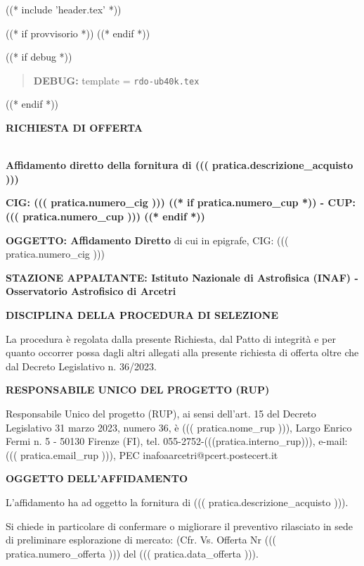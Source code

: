 
((* include 'header.tex' *))

((* if provvisorio *))
((* endif *))



\topaddr

((* if debug *))
\begin{quotation}
	\textbf{DEBUG:} template = \texttt{rdo-ub40k.tex}
\end{quotation}
((* endif *))

\begin{center}
\textbf{RICHIESTA DI OFFERTA}
\end{center}

~\\
\textbf{Affidamento diretto della fornitura di ((( pratica.descrizione_acquisto )))}

\textbf{CIG: ((( pratica.numero_cig )))
((* if pratica.numero_cup *)) - CUP: ((( pratica.numero_cup ))) ((* endif *))}

\textbf{OGGETTO: Affidamento Diretto} di cui in epigrafe, CIG: ((( pratica.numero_cig )))

\textbf{STAZIONE APPALTANTE: Istituto Nazionale di Astrofisica (INAF) - Osservatorio Astrofisico di Arcetri}

\textbf{DISCIPLINA DELLA PROCEDURA DI SELEZIONE}

La procedura è regolata dalla presente Richiesta, dal Patto di integrità
e per quanto occorrer possa dagli altri allegati alla presente richiesta
di offerta oltre che dal Decreto Legislativo n. 36/2023.


\textbf{RESPONSABILE UNICO DEL PROGETTO (RUP)}

Responsabile Unico del progetto (RUP), ai sensi dell'art. 15 del
Decreto Legislativo 31 marzo 2023, numero 36, è
 ((( pratica.nome_rup ))), Largo Enrico Fermi n. 5 - 50130 Firenze
 (FI), tel. 055-2752-(((pratica.interno_rup))),
e-mail: ((( pratica.email_rup ))), PEC inafoaarcetri@pcert.postecert.it


\textbf{OGGETTO DELL'AFFIDAMENTO}

L'affidamento ha ad oggetto la fornitura di  ((( pratica.descrizione_acquisto ))).

Si chiede in particolare di confermare o migliorare il preventivo
rilasciato in sede di preliminare esplorazione di mercato: 
(Cfr. Vs. Offerta Nr ((( pratica.numero_offerta ))) del ((( pratica.data_offerta ))).

